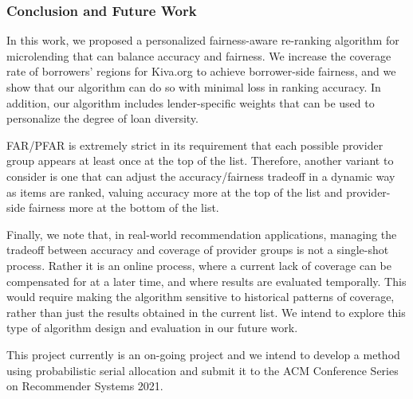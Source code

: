 \subsubsection{\textbf{Conclusion and Future Work}}\label{sect:conclusion}
In this work, we proposed a personalized fairness-aware re-ranking algorithm for microlending that can balance accuracy and fairness. We increase the coverage rate of borrowers' regions for Kiva.org to achieve borrower-side fairness, and we show that our algorithm can do so with minimal loss in ranking accuracy. In addition, our algorithm includes lender-specific weights that can be used to personalize the degree of loan diversity.



FAR/PFAR is extremely strict in its requirement that each possible provider group appears at least once at the top of the list. Therefore, another variant to consider is one that can adjust the accuracy/fairness tradeoff in a dynamic way as items are ranked, valuing accuracy more at the top of the list and provider-side fairness more at the bottom of the list.

Finally, we note that, in real-world recommendation applications, managing the tradeoff between accuracy and coverage of provider groups is not a single-shot process. Rather it is an online process, where a current lack of coverage can be compensated for at a later time, and where results are evaluated temporally. This would require making the algorithm sensitive to historical patterns of coverage, rather than just the results obtained in the current list. We intend to explore this type of algorithm design and evaluation in our future work.

This project currently is an on-going project and we intend to develop a method using probabilistic serial allocation and submit it to the ACM Conference Series on Recommender Systems 2021.